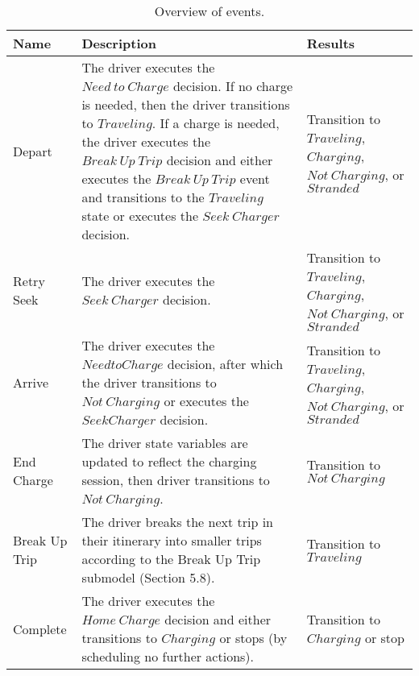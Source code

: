 \documentclass[journal]{IEEEtran}
\begin{document}
\begin{table}[!h]
\def\colmarginA{1cm}
\def\colmarginB{4cm}
\def\colmarginC{2.5cm}
\renewcommand{\arraystretch}{1.3}
\caption{Overview of events.}
\label{tab:events}
\centering
\begin{tabular}{|lll|}
\hline
Name & Description & Results \\
\hline
\parbox[t]{\colmarginA}{ \raggedright Depart }  & \parbox[t]{\colmarginB}{ \raggedright The driver executes the $Need ~to ~Charge$ decision.  If no charge is needed, then the driver transitions to $Traveling$.  If a charge is needed, the driver executes the $Break ~Up ~Trip$ decision and either executes the $Break ~Up ~Trip$ event and transitions to the $Traveling$ state or executes the $Seek ~Charger$ decision.} & \parbox[t]{\colmarginC}{ \raggedright Transition to $Traveling$, $Charging$, $Not ~Charging$, or $Stranded$}\\
\parbox[t]{\colmarginA}{ \raggedright Retry Seek}  & \parbox[t]{\colmarginB}{ \raggedright The driver executes the $Seek ~Charger$ decision.} & \parbox[t]{\colmarginC}{ \raggedright Transition to $Traveling$, $Charging$, $Not ~Charging$, or $Stranded$ }\\
\parbox[t]{\colmarginA}{ \raggedright Arrive}  & \parbox[t]{\colmarginB}{ \raggedright The driver executes the $Need to Charge$ decision, after which the driver transitions to $Not ~Charging$ or executes the $Seek Charger$ decision.} & \parbox[t]{\colmarginC}{ \raggedright Transition to $Traveling$, $Charging$, $Not ~Charging$, or $Stranded$}\\
\parbox[t]{\colmarginA}{ \raggedright End Charge}  & \parbox[t]{\colmarginB}{ \raggedright The driver state variables are updated to reflect the charging session, then driver transitions to $Not ~Charging$.} & \parbox[t]{\colmarginC}{ \raggedright Transition to $Not ~Charging$}\\
\parbox[t]{\colmarginA}{ \raggedright Break Up Trip}  & \parbox[t]{\colmarginB}{ \raggedright The driver breaks the next trip in their itinerary into smaller trips according to the Break Up Trip submodel (Section 5.8).} & \parbox[t]{\colmarginC}{ \raggedright Transition to $Traveling$}\\
\parbox[t]{\colmarginA}{ \raggedright Complete}  & \parbox[t]{\colmarginB}{ \raggedright The driver executes the $Home ~Charge$ decision and either transitions to $Charging$ or stops (by scheduling no further actions).} & \parbox[t]{\colmarginC}{ \raggedright Transition to $Charging$ or stop}\\
\hline
\end{tabular}
\end{table}
\end{document}
